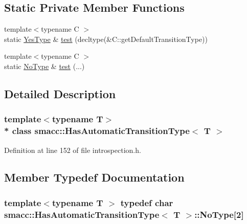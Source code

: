 \subsection*{Static Private Member Functions}
\begin{DoxyCompactItemize}
\item 
{\footnotesize template$<$typename C $>$ }\\static \hyperlink{classsmacc_1_1HasAutomaticTransitionType_a0261cbc759cb52b6f60495d327a088a4}{Yes\+Type} \& \hyperlink{classsmacc_1_1HasAutomaticTransitionType_a21a21f4a8b478bd1a5305535c67dbc03}{test} (decltype(\&C\+::get\+Default\+Transition\+Type))
\item 
{\footnotesize template$<$typename C $>$ }\\static \hyperlink{classsmacc_1_1HasAutomaticTransitionType_a28c6f5359a0ce283d8f5705ed9fb0ceb}{No\+Type} \& \hyperlink{classsmacc_1_1HasAutomaticTransitionType_a86960eaf67ddae215927bc92d91a37f2}{test} (...)
\end{DoxyCompactItemize}


\subsection{Detailed Description}
\subsubsection*{template$<$typename T$>$\\*
class smacc\+::\+Has\+Automatic\+Transition\+Type$<$ T $>$}



Definition at line 152 of file introspection.\+h.



\subsection{Member Typedef Documentation}
\subsubsection[{\texorpdfstring{No\+Type}{NoType}}]{\setlength{\rightskip}{0pt plus 5cm}template$<$typename T $>$ typedef char {\bf smacc\+::\+Has\+Automatic\+Transition\+Type}$<$ T $>$\+::No\+Type\mbox{[}2\mbox{]}\hspace{0.3cm}{\ttfamily [private]}}\hypertarget{classsmacc_1_1HasAutomaticTransitionType_a28c6f5359a0ce283d8f5705ed9fb0ceb}{}\label{classsmacc_1_1HasAutomaticTransitionType_a28c6f5359a0ce283d8f5705ed9fb0ceb}


